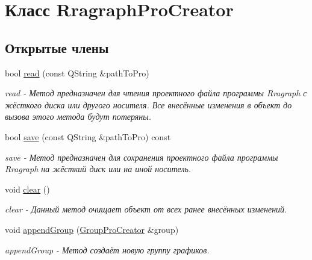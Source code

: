\hypertarget{classRragraphProCreator}{\section{Класс \-Rragraph\-Pro\-Creator}
\label{classRragraphProCreator}
}
\subsection*{Открытые члены}
\begin{DoxyCompactItemize}
\item 
bool \hyperlink{classRragraphProCreator_ab90070ea892bb8088a06ec54ab89f13a}{read} (const \-Q\-String \&path\-To\-Pro)
\begin{DoxyCompactList}\small\item\em read -\/ Метод предназначен для чтения проектного файла программы \-Rragraph с жёсткого диска или другого носителя. Все внесённые изменения в объект до вызова этого метода будут потеряны. \end{DoxyCompactList}\item 
bool \hyperlink{classRragraphProCreator_a0b6c0794de85961a1f0643ec23e8e092}{save} (const \-Q\-String \&path\-To\-Pro) const 
\begin{DoxyCompactList}\small\item\em save -\/ Метод предназначен для сохранения проектного файла программы \-Rragraph на жёсткий диск или на иной носитель. \end{DoxyCompactList}\item 
\hypertarget{classRragraphProCreator_ac259b4d4ebdd44477442126743207a5f}{void \hyperlink{classRragraphProCreator_ac259b4d4ebdd44477442126743207a5f}{clear} ()}\label{classRragraphProCreator_ac259b4d4ebdd44477442126743207a5f}

\begin{DoxyCompactList}\small\item\em clear -\/ Данный метод очищает объект от всех ранее внесённых изменений. \end{DoxyCompactList}\item 
\hypertarget{classRragraphProCreator_a10c0c0fcd520eae2dcdda77367a53334}{void \hyperlink{classRragraphProCreator_a10c0c0fcd520eae2dcdda77367a53334}{append\-Group} (\hyperlink{classGroupProCreator}{\-Group\-Pro\-Creator} \&group)}\label{classRragraphProCreator_a10c0c0fcd520eae2dcdda77367a53334}

\begin{DoxyCompactList}\small\item\em append\-Group -\/ Метод создаёт новую группу графиков. \end{DoxyCompactList}\end{DoxyCompactItemize}
